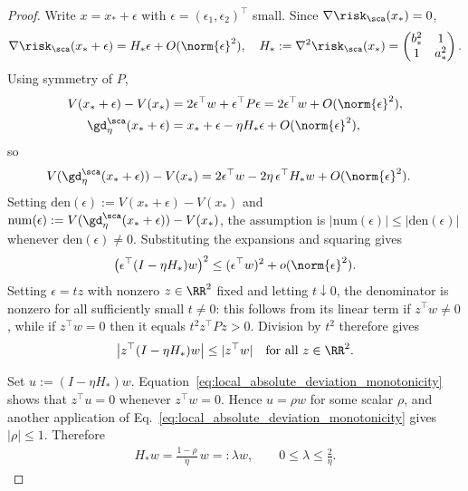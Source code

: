\documentclass{article}
\begin{document}
\begin{proof}
Write $x = x_* + \epsilon$ with $\epsilon = (\epsilon_1,\epsilon_2)^\top$ small.
Since $\nabla \risk_\sca(x_*) = 0$,
\begin{align}
    \nabla \risk_\sca(x_*+\epsilon)
    = H_* \epsilon + O(\norm{\epsilon}^2),
    \quad
    H_* := \nabla^2 \risk_\sca(x_*)
    = \begin{pmatrix} b_*^2 & 1\\ 1 & a_*^2 \end{pmatrix}.
\end{align}
Using symmetry of $P$,
\begin{align}
    V(x_*+\epsilon) - V(x_*)
    &= 2 \epsilon^\top w + \epsilon^\top P \epsilon
    = 2 \epsilon^\top w + O(\norm{\epsilon}^2),\\
    \gd_\eta^\sca(x_*+\epsilon)
    &= x_* + \epsilon - \eta H_* \epsilon + O(\norm{\epsilon}^2),
\end{align}
so
\begin{align}
    V(\gd_\eta^\sca(x_*+\epsilon)) - V(x_*)
    &= 2\epsilon^\top w - 2\eta\, \epsilon^\top H_* w + O(\norm{\epsilon}^2).
\end{align}
Setting
$\mathrm{den}(\epsilon) := V(x_*+\epsilon) - V(x_*)$ and
$\mathrm{num}(\epsilon) := V(\gd_\eta^\sca(x_*+\epsilon)) - V(x_*)$,
the assumption is $|\mathrm{num}(\epsilon)|\le|\mathrm{den}(\epsilon)|$
whenever $\mathrm{den}(\epsilon)\ne0$. Substituting the expansions and
squaring gives
\begin{align}
    \bigl(\epsilon^\top(I-\eta H_*)w\bigr)^2
    \le
    (\epsilon^\top w)^2+o(\norm{\epsilon}^2).
\end{align}
Setting $\epsilon = t z$ with nonzero $z \in \RR^2$ fixed and letting
$t \downarrow 0$, the denominator is nonzero for all sufficiently small
$t\ne0$: this follows
from its linear term if $z^\top w\ne0$, while if $z^\top w=0$ then it equals
$t^2z^\top Pz>0$. Division by $t^2$ therefore gives
\begin{align}\label{eq:local_absolute_deviation_monotonicity}
    \bigl|z^\top(I-\eta H_*)w\bigr|\le |z^\top w|
    \quad\text{for all } z\in \RR^2.
\end{align}

Set $u:=(I-\eta H_*)w$.
Equation~\eqref{eq:local_absolute_deviation_monotonicity} shows that
$z^\top u=0$ whenever $z^\top w=0$. Hence $u=\rho w$ for some scalar $\rho$,
and another application of
Eq.~\eqref{eq:local_absolute_deviation_monotonicity} gives $|\rho|\le1$.
Therefore
\begin{align}
    H_*w=\frac{1-\rho}{\eta}\,w=:\lambda w,
    \qquad
    0\le\lambda\le\frac2\eta.
\end{align}


\end{proof}
\end{document}
